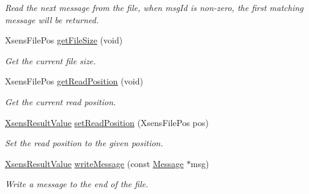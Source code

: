 \begin{DoxyCompactItemize}
\begin{DoxyCompactList}\small\item\em \-Read the next message from the file, when msg\-Id is non-\/zero, the first matching message will be returned. \end{DoxyCompactList}\item 
\hypertarget{classxsens_1_1Cmt2f_a45b76f16f94a4feda86cc1166a7e071a}{\-Xsens\-File\-Pos \hyperlink{classxsens_1_1Cmt2f_a45b76f16f94a4feda86cc1166a7e071a}{get\-File\-Size} (void)}\label{classxsens_1_1Cmt2f_a45b76f16f94a4feda86cc1166a7e071a}

\begin{DoxyCompactList}\small\item\em \-Get the current file size. \end{DoxyCompactList}\item 
\hypertarget{classxsens_1_1Cmt2f_aa284e6ef98fcc1c498277b69f9f22ce3}{\-Xsens\-File\-Pos \hyperlink{classxsens_1_1Cmt2f_aa284e6ef98fcc1c498277b69f9f22ce3}{get\-Read\-Position} (void)}\label{classxsens_1_1Cmt2f_aa284e6ef98fcc1c498277b69f9f22ce3}

\begin{DoxyCompactList}\small\item\em \-Get the current read position. \end{DoxyCompactList}\item 
\hypertarget{classxsens_1_1Cmt2f_a532086145d3cdd01f95eef876e2b0e96}{\hyperlink{group__enums_ga822a2260a20af524029eef9e9a51ff6f}{\-Xsens\-Result\-Value} \hyperlink{classxsens_1_1Cmt2f_a532086145d3cdd01f95eef876e2b0e96}{set\-Read\-Position} (\-Xsens\-File\-Pos pos)}\label{classxsens_1_1Cmt2f_a532086145d3cdd01f95eef876e2b0e96}

\begin{DoxyCompactList}\small\item\em \-Set the read position to the given position. \end{DoxyCompactList}\item 
\hypertarget{classxsens_1_1Cmt2f_a1c665af24300d003856973621f1786c6}{\hyperlink{group__enums_ga822a2260a20af524029eef9e9a51ff6f}{\-Xsens\-Result\-Value} \hyperlink{classxsens_1_1Cmt2f_a1c665af24300d003856973621f1786c6}{write\-Message} (const \hyperlink{classxsens_1_1Message}{\-Message} $\ast$msg)}\label{classxsens_1_1Cmt2f_a1c665af24300d003856973621f1786c6}

\begin{DoxyCompactList}\small\item\em \-Write a message to the end of the file. \end{DoxyCompactList}\end{DoxyCompactItemize}
